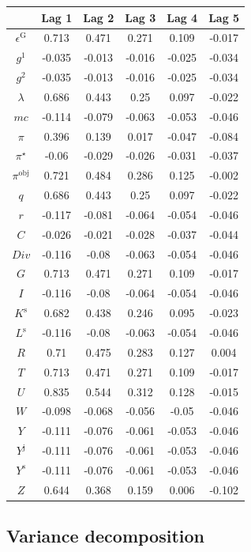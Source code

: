 \begin{tabular}{c|ccccc|}
  & Lag 1 & Lag 2 & Lag 3 & Lag 4 & Lag 5\\
\hline
$\epsilon^{\mathrm{G}}$ & 0.713 & 0.471 & 0.271 & 0.109 & -0.017 \\
$g^{\mathrm{1}}$ & -0.035 & -0.013 & -0.016 & -0.025 & -0.034 \\
$g^{\mathrm{2}}$ & -0.035 & -0.013 & -0.016 & -0.025 & -0.034 \\
$\lambda$ & 0.686 & 0.443 & 0.25 & 0.097 & -0.022 \\
${m\!c}$ & -0.114 & -0.079 & -0.063 & -0.053 & -0.046 \\
$\pi$ & 0.396 & 0.139 & 0.017 & -0.047 & -0.084 \\
$\pi^{\star}$ & -0.06 & -0.029 & -0.026 & -0.031 & -0.037 \\
$\pi^{\mathrm{obj}}$ & 0.721 & 0.484 & 0.286 & 0.125 & -0.002 \\
$q$ & 0.686 & 0.443 & 0.25 & 0.097 & -0.022 \\
$r$ & -0.117 & -0.081 & -0.064 & -0.054 & -0.046 \\
$C$ & -0.026 & -0.021 & -0.028 & -0.037 & -0.044 \\
${D\!i\!v}$ & -0.116 & -0.08 & -0.063 & -0.054 & -0.046 \\
$G$ & 0.713 & 0.471 & 0.271 & 0.109 & -0.017 \\
$I$ & -0.116 & -0.08 & -0.064 & -0.054 & -0.046 \\
$K^{\mathrm{s}}$ & 0.682 & 0.438 & 0.246 & 0.095 & -0.023 \\
$L^{\mathrm{s}}$ & -0.116 & -0.08 & -0.063 & -0.054 & -0.046 \\
$R$ & 0.71 & 0.475 & 0.283 & 0.127 & 0.004 \\
$T$ & 0.713 & 0.471 & 0.271 & 0.109 & -0.017 \\
$U$ & 0.835 & 0.544 & 0.312 & 0.128 & -0.015 \\
$W$ & -0.098 & -0.068 & -0.056 & -0.05 & -0.046 \\
$Y$ & -0.111 & -0.076 & -0.061 & -0.053 & -0.046 \\
$Y^{\mathrm{j}}$ & -0.111 & -0.076 & -0.061 & -0.053 & -0.046 \\
$Y^{\mathrm{s}}$ & -0.111 & -0.076 & -0.061 & -0.053 & -0.046 \\
$Z$ & 0.644 & 0.368 & 0.159 & 0.006 & -0.102 \\
\hline
\end{tabular}


\subsection{Variance decomposition}

